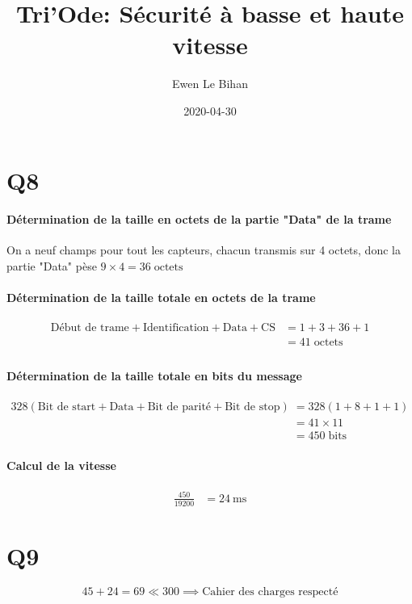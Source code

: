 \documentclass{article}
\title{Tri'Ode: Sécurité à basse et haute vitesse}
\author{Ewen Le Bihan}
\date{2020-04-30}
\begin{document}
\maketitle

\section{Q8}

\paragraph{Détermination de la taille en octets de la partie "Data" de la trame}

On a neuf champs pour tout les capteurs, chacun transmis sur 4 octets, donc la partie "Data" pèse $9 \times 4 = 36 \;\text{octets}$

\paragraph{Détermination de la taille totale en octets de la trame}

\begin{equation*}
    \begin{split}
        \text{Début de trame} + \text{Identification} + \text{Data} + \text{CS} &= 1 + 3 + 36 + 1 \\
        &= 41\;\text{octets} \\
    \end{split}
\end{equation*}

\paragraph{Détermination de la taille totale en bits du message}

\begin{equation*}
    \begin{split}
        328 (\text{Bit de start} + \text{Data} + \text{Bit de parité} + \text{Bit de stop}) &= 328(1 + 8 + 1 + 1) \\
        &= 41\times11 \\
        &= 450 \;\text{bits}
    \end{split}
\end{equation*}

\paragraph{Calcul de la vitesse}
\begin{equation*}
    \begin{split}
        \frac{450}{19200} &= \SI{24}{\milli\second}
    \end{split}
\end{equation*}

\section{Q9}

$$45 + 24 = 69 \ll 300 \implies \text{Cahier des charges respecté}$$
\end{document}
